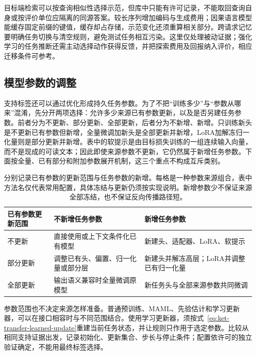 目标端检索可以按查询相似性选择示范，但库中只能有许可记录，不能取回查询自身或按评价单位应隔离的同源答案。较长序列增加编码与生成费用；因果语言模型能缓存固定前缀的键值，缓存却占存储，示范变化还须重算相关部分。跨请求记忆要明确任务切换与清空规则，避免测试任务相互污染。这里仅处理被动证据；强化学习的任务推断还需主动选择动作获得反馈，并把探索费用及回报纳入评价，相应迁移条件可参考。

\subsection{模型参数的调整}
\label{sec:ket-transfer-parameter-adaptation}

支持标签还可以通过优化形成持久任务参数。为了不把“训练多少”与“参数从哪来”混淆，先分开两项选择：允许多少来源已有参数更新，以及是否另建任务参数。前者分为不更新、部分更新、全部更新，后者分为不新增、新增。只训练新头是不更新已有参数但新增，全量微调加新头是全部更新并新增，LoRA加解冻归一化量则是部分更新并新增。表中的软提示是由目标损失训练的一组连续输入向量，而不是现成的可读文本；因此即使来源参数不更新，它仍然属于新增任务参数。下面按全量、已有部分和附加参数展开机制，这三个重点不构成互斥类别。

\begin{table}[htbp]
  \centering
  \small
  \begin{tabularx}{\linewidth}{p{28mm}XX}
    \toprule
    已有参数更新范围 & 不新增任务参数 & 新增任务参数 \\
    \midrule
    不更新 & 直接使用或上下文条件化已有模型 & 新建头、适配器、LoRA、软提示 \\
    部分更新 & 调整已有头、偏置、归一化量或部分层 & 新建头并解冻高层；LoRA并调整已有归一化量 \\
    全部更新 & 输出语义兼容时全量微调原模型 & 新任务头与全部来源参数共同微调 \\
    \bottomrule
  \end{tabularx}
  \caption{分别记录已有参数的更新范围与任务参数的新增。每格是一种参数来源组合，表中方法名仅代表常用配置，具体冻结与更新仍须按实现说明。新增参数少不保证来源全部冻结，也不保证反向传播路径短。}
  \label{tab:ket-transfer-parameter-axes}
\end{table}

参数范围也不决定来源怎样准备。普通预训练、MAML、先验估计和学习更新器，可以在接口相容时与不同范围结合。使用学习更新器，须按式~\eqref{eq:ket-transfer-learned-update}重建当前任务状态，并让规则只作用于选定参数。比较从相同支持证据出发，记录初始化、更新集合、步长与停止条件；配置依许可的独立验证确定，不能用最终标签选择。

